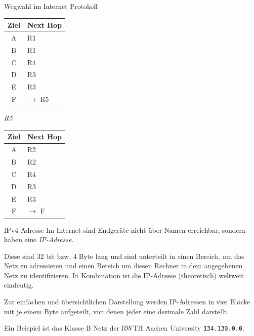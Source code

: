 \begin{example}{Wegwahl im Internet Protokoll}
\begin{minipage}{0.25\textwidth}
\begin{center}
            \begin{tabular}{|c|l|}
                \hline
                Ziel & Next Hop \\\hline\hline
                A    & R1       \\
                B    & R1       \\
                C    & R4       \\
                D    & R3       \\
                E    & R3       \\
                F    & $\to$ R5 \\\hline
            \end{tabular}
        \end{center}
    \end{minipage}
    \begin{minipage}{0.25\textwidth}
        \begin{center}
            \emph{R5}
            
            \begin{tabular}{|c|l|}
                \hline
                Ziel & Next Hop \\\hline\hline
                A    & R2       \\
                B    & R2       \\
                C    & R4       \\
                D    & R3       \\
                E    & R3       \\
                F    & $\to$ F  \\\hline
            \end{tabular}
        \end{center}
    \end{minipage}
\end{example}

\begin{defi}{IPv4-Adresse}
    Im Internet sind Endgeräte nicht über Namen erreichbar, sondern haben eine \emph{IP-Adresse}.
    
    Diese sind 32 bit bzw. 4 Byte lang und sind unterteilt in einen Bereich, um das Netz zu adressieren und einen Bereich um diesen Rechner in dem angegebenen Netz zu identifizieren.
    In Kombination ist die IP-Adresse (theoretisch) weltweit eindeutig.
    
    Zur einfachen und übersichtlichen Darstellung werden IP-Adressen in vier Blöcke mit je einem Byte aufgeteilt, von denen jeder eine dezimale Zahl darstellt.
    
    Ein Beispiel ist das Klasse B Netz der RWTH Aachen University \texttt{134.130.0.0}.
\end{defi}

